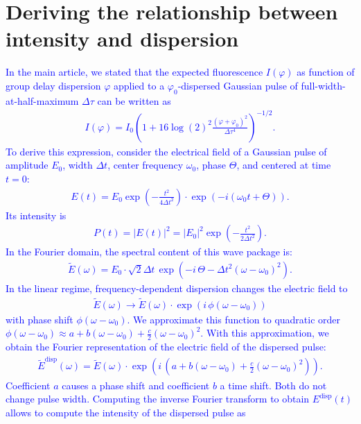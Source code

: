 \documentclass[10pt,letterpaper]{article}
\newcommand{\complexi}{i}
\begin{document}
\section{Deriving the relationship between intensity and dispersion}
\textcolor{blue}{In the main article, we stated that the expected fluorescence $I(\varphi)$ as function of group delay dispersion $\varphi$ applied to a $\varphi_0$-dispersed Gaussian pulse of full-width-at-half-maximum $\Delta\tau$ can be written as
\begin{eqnarray}
    I(\varphi)=I_0 \left(1+16\log(2)^2\frac{(\varphi+\varphi_0)^2}{\Delta\tau^4}\right)^{-1/2}\label{main}.
\end{eqnarray}
To derive this expression, consider the electrical field of a Gaussian pulse of amplitude $E_0$, width $\Delta t$, center frequency $\omega_0$, phase $\Theta$, and centered at time $t=0$:
\begin{eqnarray}
E(t)=E_0\exp\left(-\frac{t^2}{4\Delta t^2}\right)\cdot\exp\left(-\complexi\left(\omega_0 t + \Theta\right)\right).
\end{eqnarray}
Its intensity is 
\begin{eqnarray}
P(t) = |E(t)|^2 = |E_0|^2 \exp\left(-\frac{t^2}{2\Delta t^2}\right)\label{intens}.
\end{eqnarray}
In the Fourier domain, the spectral content of this wave package is:
\begin{eqnarray}
\tilde{E}(\omega)=E_0\cdot\sqrt{2}\Delta t\, \exp\left(-\complexi\,\Theta -\Delta t^2(\omega - \omega_0)^2\right).
\end{eqnarray}
In the linear regime, frequency-dependent dispersion changes the electric field to
\begin{eqnarray}
\tilde{E}(\omega)\to\tilde{E}(\omega)\cdot\exp\left(\complexi\,\phi(\omega-\omega_0)\right)
\end{eqnarray}
with phase shift $\phi(\omega-\omega_0)$. We approximate this function to quadratic order $\phi(\omega-\omega_0)\approx a + b(\omega-\omega_0) + \frac{c}{2}(\omega-\omega_0)^2$. With this approximation, we obtain the Fourier representation of the electric field of the dispersed pulse:
\begin{eqnarray}
\tilde{E}^\text{disp}(\omega)=\tilde{E}(\omega)\cdot\exp\left(\complexi\,\left(a + b(\omega-\omega_0) + \frac{c}{2}(\omega-\omega_0)^2\right)\right).
\end{eqnarray}
Coefficient $a$ causes a phase shift and coefficient $b$ a time shift. Both do not change pulse width. Computing the inverse Fourier transform to obtain $E^\text{disp}(t)$ allows to compute the intensity of the dispersed pulse as 
}
\end{document}
